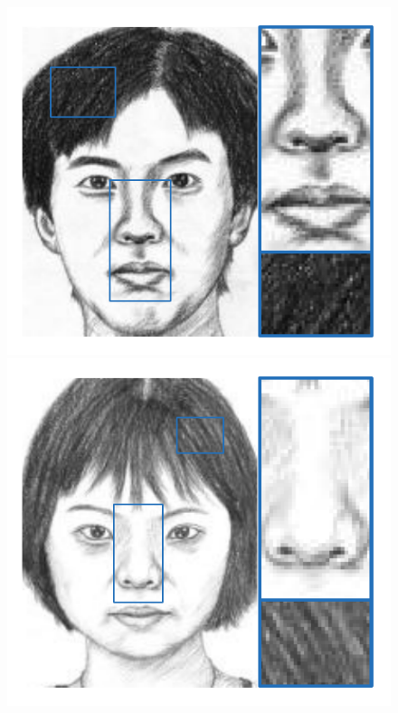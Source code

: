 \documentclass[10pt,twocolumn,letterpaper]{article}
\begin{document}
\begin{figure}[htbp]
\centering
\begin{minipage}[t]{0.138\linewidth}
\centering
\includegraphics[width=0.99\linewidth]{img/example1_gro.pdf}
\includegraphics[width=0.99\linewidth]{img/example2_gro.pdf}

\end{minipage}
\end{figure}
\end{document}
